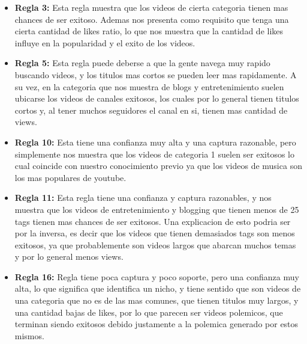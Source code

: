 \begin{itemize}
\begin{itemize}
                    \item \textbf{Regla 3:} Esta regla muestra que los videos de
                    cierta categoria tienen mas chances de ser exitoso. Ademas
                    nos presenta como requisito que tenga una cierta cantidad
                    de likes ratio, lo que nos muestra que la cantidad de likes
                    influye en la popularidad y el exito de los videos.

                    \item \textbf{Regla 5:} Esta regla puede deberse a que la
                    gente navega muy rapido buscando videos, y los titulos mas
                    cortos se pueden leer mas rapidamente. A su vez, en la
                    categoria que nos muestra de blogs y entretenimiento suelen
                    ubicarse los videos de canales exitosos, los cuales por lo
                    general tienen titulos cortos y, al tener muchos seguidores
                    el canal en si, tienen mas cantidad de views.

                    \item \textbf{Regla 10:} Esta tiene una confianza muy alta
                    y una captura razonable, pero simplemente nos muestra que
                    los videos de categoria 1 suelen ser exitosos lo cual
                    coincide con nuestro conocimiento previo ya que los videos
                    de musica son los mas populares de youtube.

                    \item \textbf{Regla 11:} Esta regla tiene una confianza y
                    captura razonables, y nos muestra que los videos de
                    entretenimiento y blogging que tienen menos de 25 tags
                    tienen mas chances de ser exitosos. Una explicacion de esto
                    podria ser por la inversa, es decir que los videos que
                    tienen demasiados tags son menos exitosos, ya que
                    probablemente son videos largos que abarcan muchos temas y
                    por lo general menos views.

                    \item \textbf{Regla 16:} Regla tiene poca captura y poco
                    soporte, pero una confianza muy alta, lo que significa que
                    identifica un nicho, y tiene sentido que son videos de una
                    categoria que no es de las mas comunes, que tienen titulos
                    muy largos, y una cantidad bajas de likes, por lo que
                    parecen ser videos polemicos, que terminan siendo exitosos
                    debido justamente a la polemica generado por estos mismos.


\end{itemize}
\end{itemize}
